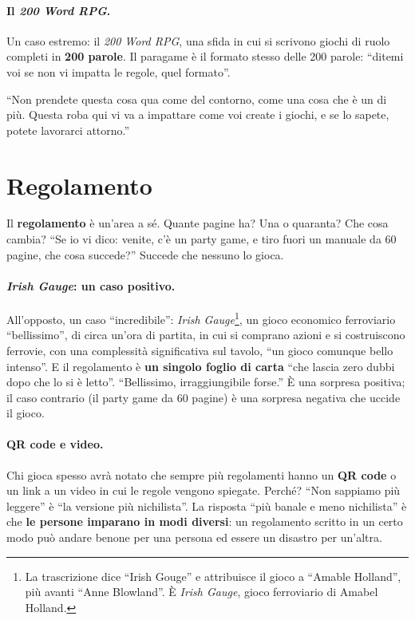 \paragraph{Il \emph{200 Word RPG}.} Un caso estremo: il \emph{200 Word RPG}, una sfida
in cui si scrivono giochi di ruolo completi in \textbf{200 parole}. Il paragame è il
formato stesso delle 200 parole: ``ditemi voi se non vi impatta le regole, quel
formato''.

``Non prendete questa cosa qua come del contorno, come una cosa che è un di più.
Questa roba qui vi va a impattare come voi create i giochi, e se lo sapete, potete
lavorarci attorno.''

\section{Regolamento}
\label{a10:sec:regolamento}

Il \textbf{regolamento} è un'area a sé. Quante pagine ha? Una o quaranta? Che cosa
cambia? ``Se io vi dico: venite, c'è un party game, e tiro fuori un manuale da 60
pagine, che cosa succede?'' Succede che nessuno lo gioca.

\paragraph{\emph{Irish Gauge}: un caso positivo.} All'opposto, un caso ``incredibile'':
\emph{Irish Gauge}\footnote{La trascrizione dice ``Irish Gouge'' e attribuisce il gioco a
``Amable Holland'', più avanti ``Anne Blowland''. È \emph{Irish Gauge}, gioco
ferroviario di Amabel Holland.}, un gioco economico ferroviario ``bellissimo'', di circa
un'ora di partita, in cui si comprano azioni e si costruiscono ferrovie, con una
complessità significativa sul tavolo, ``un gioco comunque bello intenso''. E il
regolamento è \textbf{un singolo foglio di carta} ``che lascia zero dubbi dopo che lo si
è letto''. ``Bellissimo, irraggiungibile forse.'' È una sorpresa positiva; il caso
contrario (il party game da 60 pagine) è una sorpresa negativa che uccide il gioco.

\paragraph{QR code e video.} Chi gioca spesso avrà notato che sempre più regolamenti
hanno un \textbf{QR code} o un link a un video in cui le regole vengono spiegate.
Perché? ``Non sappiamo più leggere'' è ``la versione più nichilista''. La risposta ``più
banale e meno nichilista'' è che \textbf{le persone imparano in modi diversi}: un
regolamento scritto in un certo modo può andare benone per una persona ed essere un
disastro per un'altra.

